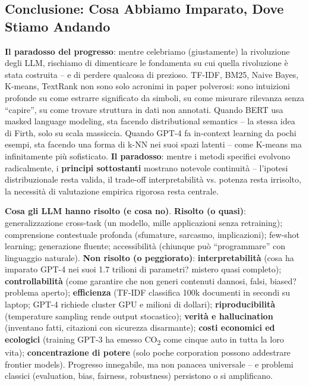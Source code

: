 \documentclass[12pt,a4paper]{article}
\begin{document}
\subsection{Conclusione: Cosa Abbiamo Imparato, Dove Stiamo Andando}

\textbf{Il paradosso del progresso}: mentre celebriamo (giustamente) la rivoluzione degli LLM, rischiamo di dimenticare le fondamenta su cui quella rivoluzione \`e stata costruita -- e di perdere qualcosa di prezioso. TF-IDF, BM25, Naive Bayes, K-means, TextRank non sono solo acronimi in paper polverosi: sono intuizioni profonde su come estrarre significato da simboli, su come misurare rilevanza senza ``capire'', su come trovare struttura in dati non annotati. Quando BERT usa masked language modeling, sta facendo distributional semantics -- la stessa idea di Firth, solo su scala massiccia. Quando GPT-4 fa in-context learning da pochi esempi, sta facendo una forma di k-NN nei suoi spazi latenti -- come K-means ma infinitamente pi\`u sofisticato. \textbf{Il paradosso}: mentre i metodi specifici evolvono radicalmente, i \textbf{principi sottostanti} mostrano notevole continuit\`a -- l'ipotesi distribuzionale resta valida, il trade-off interpretabilit\`a vs. potenza resta irrisolto, la necessit\`a di valutazione empirica rigorosa resta centrale.

\textbf{Cosa gli LLM hanno risolto (e cosa no)}. \textbf{Risolto (o quasi)}: generalizzazione cross-task (un modello, mille applicazioni senza retraining); comprensione contestuale profonda (sfumature, sarcasmo, implicazioni); few-shot learning; generazione fluente; accessibilit\`a (chiunque pu\`o ``programmare'' con linguaggio naturale). \textbf{Non risolto (o peggiorato)}: \textbf{interpretabilit\`a} (cosa ha imparato GPT-4 nei suoi 1.7 trilioni di parametri? mistero quasi completo); \textbf{controllabilit\`a} (come garantire che non generi contenuti dannosi, falsi, biased? problema aperto); \textbf{efficienza} (TF-IDF classifica 100k documenti in secondi su laptop; GPT-4 richiede cluster GPU e milioni di dollari); \textbf{riproducibilit\`a} (temperature sampling rende output stocastico); \textbf{verit\`a e hallucination} (inventano fatti, citazioni con sicurezza disarmante); \textbf{costi economici ed ecologici} (training GPT-3 ha emesso CO\textsubscript{2} come cinque auto in tutta la loro vita); \textbf{concentrazione di potere} (solo poche corporation possono addestrare frontier models). Progresso innegabile, ma non panacea universale -- e problemi classici (evaluation, bias, fairness, robustness) persistono o si amplificano.
\end{document}
